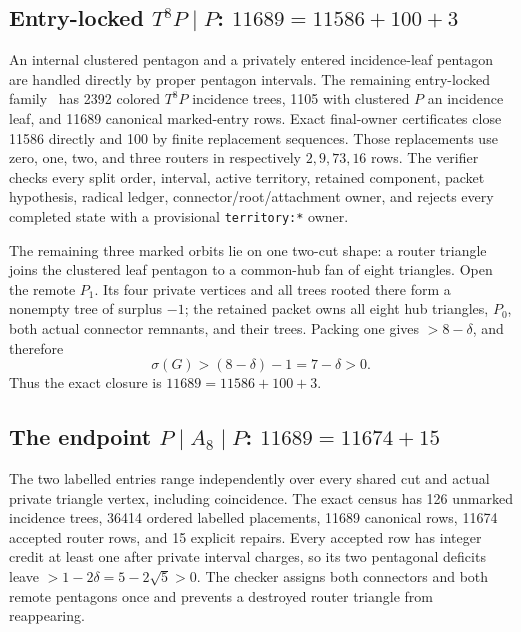 \documentclass[11pt]{article}
\newcommand{\sig}{\sigma}
\begin{document}
\subsection{Entry-locked \texorpdfstring{$T^8P\mid P$}{T8P | P}:
\texorpdfstring{$11689=11586+100+3$}{11689 = 11586 + 100 + 3}}

An internal clustered pentagon and a privately entered incidence-leaf
pentagon are handled directly by proper pentagon intervals.  The remaining
entry-locked family~\cite{T8PCode} has 2392 colored $T^8P$ incidence trees,
1105 with clustered $P$ an incidence leaf, and 11689 canonical marked-entry
rows.  Exact final-owner certificates close 11586 directly and 100 by finite
replacement sequences.  Those replacements use zero, one, two, and three
routers in respectively $2,9,73,16$ rows.  The verifier checks every split
order, interval, active territory, retained component, packet hypothesis,
radical ledger, connector/root/attachment owner, and rejects every completed
state with a provisional \texttt{territory:*} owner.

The remaining three marked orbits lie on one two-cut shape: a router triangle
joins the clustered leaf pentagon to a common-hub fan of eight triangles.  Open
the remote $P_1$.  Its four private vertices and all trees rooted there form a
nonempty tree of surplus $-1$; the retained packet owns all eight hub
triangles, $P_0$, both actual connector remnants, and their trees.  Packing one
gives $>8-\delta$, and therefore
\[
 \sig(G)>(8-\delta)-1=7-\delta>0.
\]
Thus the exact closure is $11689=11586+100+3$.

\subsection{The endpoint \texorpdfstring{$P\mid A_8\mid P$}{P | A8 | P}:
\texorpdfstring{$11689=11674+15$}{11689 = 11674 + 15}}

The two labelled entries range independently over every shared cut and actual
private triangle vertex, including coincidence.  The exact census
\cite{A8Proof,A8Code} has 126 unmarked incidence trees, 36414 ordered labelled
placements, 11689 canonical rows, 11674 accepted router rows, and 15 explicit
repairs.  Every accepted row has integer credit at least one after private
interval charges, so its two pentagonal deficits leave
$>1-2\delta=5-2\sqrt5>0$.  The checker assigns both connectors and both remote
pentagons once and prevents a destroyed router triangle from reappearing.
\end{document}
